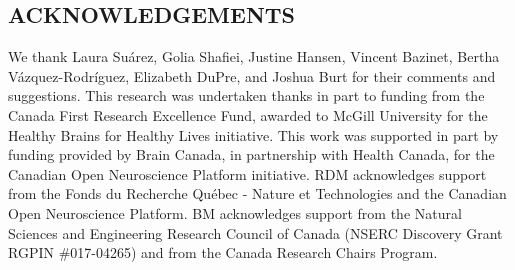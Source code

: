 \documentclass[12pt,aps,pra,reprint,showkeys]{revtex4-1}
\renewcommand{\thetable}{\arabic{table}}
\newcommand{\beginsupplement}{
  \setcounter{equation}{0} \renewcommand{\theequation}{S\arabic{equation}}
  \setcounter{table}{0} \renewcommand{\thetable}{S\arabic{table}}
  \setcounter{figure}{0} \renewcommand{\thefigure}{S\arabic{figure}}
}
\begin{document}
\subsection*{ACKNOWLEDGEMENTS}

We thank Laura Su{\'a}rez, Golia Shafiei, Justine Hansen, Vincent Bazinet, Bertha V{\'a}zquez-Rodr{\'i}guez, Elizabeth DuPre, and Joshua Burt for their comments and suggestions.
This research was undertaken thanks in part to funding from the Canada First Research Excellence Fund, awarded to McGill University for the Healthy Brains for Healthy Lives initiative.
This work was supported in part by funding provided by Brain Canada, in partnership with
Health Canada, for the Canadian Open Neuroscience Platform initiative.
RDM acknowledges support from the Fonds du Recherche Qu{\'e}bec - Nature et Technologies and the Canadian Open Neuroscience Platform.
BM acknowledges support from the Natural Sciences and Engineering Research Council of Canada (NSERC Discovery Grant RGPIN \#017-04265) and from the Canada Research Chairs Program.



\clearpage

\beginsupplement
\end{document}
